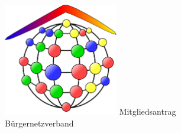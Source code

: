 \documentclass[a4paper,10pt]{article}
\begin{document}
\begin{imagetextbox}[]{8cm}{3mm}
	\includegraphics[width=5cm]{logo}
	\tcblower
	\vspace{0.5cm}
	Mitgliedsantrag \\
	Bürgernetzverband
\end{imagetextbox}
\end{document}
